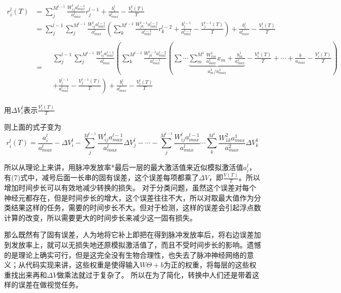 \documentclass[a4paper,11pt,onecolumn,oneside,UTF8]{article}
\begin{document}
$$
\begin{aligned}
    r_i^l(T) &=\sum_j^{M^{l-1}}\frac{W_{ij}^la_{max}^{l-1}}{a_{max}^l}r_j^{l-1}+\frac{b_i^l}{a_{max}^l} - \frac{V_i^l(T)}{T} \\
    &=\sum_j^{l-1} \sum_j^{M^{l-1}}\frac{W_{ij}^la_{max}^{l-1}}{a_{max}^l}\left(\sum_k^{M^{l-2}}\frac{W_{jk}^{l-1}a_{max}^{l-2}}{a_{max}^{l-1}}r_k^{l-2}+\frac{b_j^{l-1}}{a_{max}^{l-1}} - \frac{V_j^{l-1}(T)}{T} \right) + \frac{b_i^l}{a_{max}^l} - \frac{V_i^{l}(T)}{T}\\
    &= \begin{split}
        &\sum_j^{l-1} \sum_j^{M^{l-1}}\frac{W_{ij}^la_{max}^{l-1}}{a_{max}^l}\left(\sum_k^{M^{l-2}}\frac{W_{jk}^{l-1}a_{max}^{l-2}}{a_{max}^{l-1}}\left(\sum\cdots \underbrace{\sum_m^{M^{1}}\frac{W_{1m}^1}{a_{max}^1}x_m+\frac{b_m^1}{a_{max}^1}}_{a_m^1/a_{max}^1} - \frac{V_i^1(T)}{T} + \cdots + \frac{b}{a_{max}} - \frac{V_i^l(T)}{T} \right) \right.\\ 
        &\left. + \frac{b_j^{l-1}}{a_{max}^{l-1}} - \frac{V_j^{l-1}(T)}{T} \right) + \frac{b_i^l}{a_{max}^l} - \frac{V_i^{l}(T)}{T}
    \end{split}
\end{aligned}
$$

用$\Delta V_i^l$表示$\frac{V_i^{l}(T)}{T}$

则上面的式子变为
\begin{equation}
    r_i^l(T) = \frac{a_i^l}{a_{max}^l} - \Delta V_i^l - \sum_j^{M^{l-1}}\frac{W_{ij}^la_{max}^{l-1}}{a_{max}^l}\Delta V_j^l - \cdots -\sum_j^{M^{l-1}}\frac{W_{ij}^la_{max}^{l-1}}{a_{max}^l} \cdots \sum_k^{M^{1}}\frac{W_{1k}^2 a_{max}^1}{a_{max}^2} \Delta V_k^1
\end{equation}

所以从理论上来讲，用脉冲发放率*最后一层的最大激活值来近似模拟激活值$a_i^l$，有(7)式中，减号后面一长串的固有误差，这个误差每项都乘了$\Delta V$，即$\frac{V(T)}{T}$。所以增加时间步长可以有效地减少转换的损失。
对于分类问题，虽然这个误差对每个神经元都存在，但是时间步长的增大，这个误差往往不大，所以对取最大值作为分类结果这样的任务，需要的时间步长不大。但对于检测，这样的误差会引起浮点数计算的改变，所以需要更大的时间步长来减少这一固有损失。

那么既然有了固有误差，人为地将它补上即把在得到脉冲发放率后，将右边误差加到发放率上，就可以无损失地还原模拟激活值了，而且不受时间步长的影响。遗憾的是理论上确实可行，但是这完全没有生物合理性，也失去了脉冲神经网络的意义；从代码实现来讲，这些权重是使得输入$W\Theta+b$为正的权重，将每层的这些权重找出来再和$\Delta V$做乘法就过于复杂了。
所以在为了简化，转换中人们还是带着这样的误差在做视觉任务。
\end{document}
